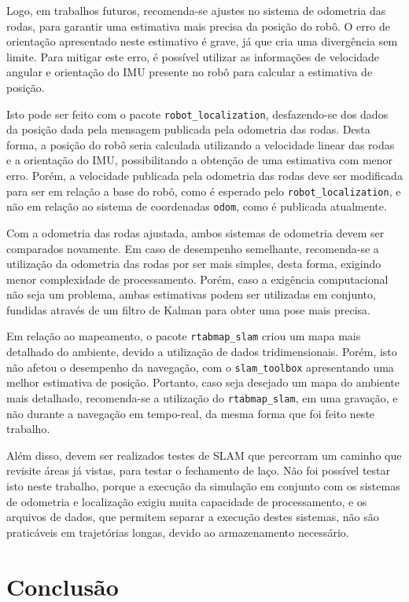 \documentclass[repeatfields,xlists,xpacks,oneside,yearsonly]{ufrgscca}
\begin{document}
Logo, em trabalhos futuros, recomenda-se ajustes no sistema de
odometria das rodas, para garantir uma estimativa mais precisa da
posição do robô. O erro de orientação apresentado neste estimativo é
grave, já que cria uma divergência sem limite. Para mitigar este
erro, é possível utilizar as informações de velocidade angular e
orientação do IMU presente no robô para calcular a estimativa de
posição.

Isto pode ser feito com o pacote \texttt{robot\_localization},
desfazendo-se dos dados da posição dada pela mensagem publicada pela
odometria das rodas. Desta forma, a posição do robô seria calculada
utilizando a velocidade linear das rodas e a orientação do IMU,
possibilitando a obtenção de uma estimativa com menor erro. Porém, a
velocidade publicada pela odometria das rodas deve ser modificada
para ser em relação a base do robô, como é esperado pelo
\texttt{robot\_localization}, e não em relação ao sistema de
coordenadas \texttt{odom}, como é publicada atualmente.

Com a odometria das rodas ajustada, ambos sistemas de odometria devem
ser comparados novamente. Em caso de desempenho semelhante,
recomenda-se a utilização da odometria das rodas por ser mais
simples, desta forma, exigindo menor complexidade de processamento.
Porém, caso a exigência computacional não seja um problema, ambas
estimativas podem ser utilizadas em conjunto, fundidas através de um
filtro de Kalman para obter uma pose mais precisa.

Em relação ao mapeamento, o pacote \texttt{rtabmap\_slam} criou um
mapa mais detalhado do ambiente, devido a utilização de dados
tridimensionais. Porém, isto não afetou o desempenho da navegação,
com o \texttt{slam\_toolbox} apresentando uma melhor estimativa de
posição. Portanto, caso seja desejado um mapa do ambiente mais
detalhado, recomenda-se a utilização do \texttt{rtabmap\_slam}, em
uma gravação, e não durante a navegação em tempo-real, da mesma forma
que foi feito neste trabalho.

Além disso, devem ser realizados testes de SLAM que percorram um
caminho que revisite áreas já vistas, para testar o fechamento de
laço. Não foi possível testar isto neste trabalho, porque a execução
da simulação em conjunto com os sistemas de odometria e localização
exigiu muita capacidade de processamento, e os arquivos de dados, que
permitem separar a execução destes sistemas, não são praticáveis em
trajetórias longas, devido ao armazenamento necessário.

\chapter{Conclusão}
\label{conclusao}
\end{document}
